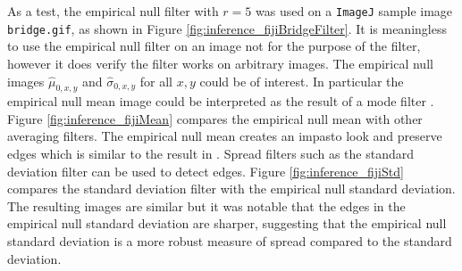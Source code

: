 As a test, the empirical null filter with $r=5$ was used on a \texttt{ImageJ} sample image \texttt{bridge.gif}, as shown in Figure \ref{fig:inference_fijiBridgeFilter}. It is meaningless to use the empirical null filter on an image not for the purpose of the filter, however it does verify the filter works on arbitrary images. The empirical null images $\widehat{\mu}_{0,x,y}$ and $\widehat{\sigma}_{0,x,y}$ for all ${x,y}$ could be of interest. In particular the empirical null mean image could be interpreted as the result of a mode filter \citep{griffin2000mean}. Figure \ref{fig:inference_fijiMean} compares the empirical null mean with other averaging filters. The empirical null mean creates an impasto look and preserve edges which is similar to the result in \cite{griffin2000mean}. Spread filters such as the standard deviation filter can be used to detect edges. Figure \ref{fig:inference_fijiStd} compares the standard deviation filter with the empirical null standard deviation. The resulting images are similar but it was notable that the edges in the empirical null standard deviation are sharper, suggesting that the empirical null standard deviation is a more robust measure of spread compared to the standard deviation.

